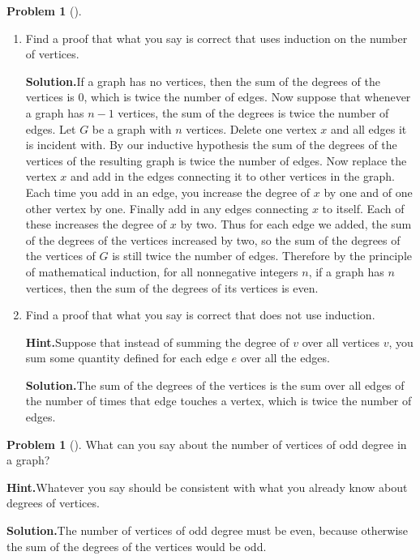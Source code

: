 \documentclass[10pt,]{book}
\theoremstyle{plain}
\theoremstyle{definition}
\newtheorem{activity}[project]{Problem}
\theoremstyle{definition}
\numberwithin{equation}{chapter}
\begin{document}
\begin{activity}[]
\begin{enumerate}[font=\bfseries,label=(\alph*),ref=\alph*]
\item\label{task-89} Find a proof that what you say is correct that uses induction on the number of vertices.%
\par\medskip\noindent%
\textbf{Solution.}\quad If a graph has no vertices, then the sum of the degrees of the vertices is 0, which is twice the number of edges. Now suppose that whenever a graph has \(n-1\) vertices, the sum of the degrees is twice the number of edges. Let \(G\) be a graph with \(n\) vertices. Delete one vertex \(x\) and all edges it is incident with. By our inductive hypothesis the sum of the degrees of the vertices of the resulting graph is twice the number of edges. Now replace the vertex \(x\) and add in the edges connecting it to other vertices in the graph. Each time you add in an edge, you increase the degree of \(x\) by one and of one other vertex by one. Finally add in any edges connecting \(x\) to itself. Each of these increases the degree of \(x\) by two. Thus for each edge we added, the sum of the degrees of the vertices increased by two, so the sum of the degrees of the vertices of \(G\) is still twice the number of edges. Therefore by the principle of mathematical induction, for all nonnegative integers \(n\), if a graph has \(n\) vertices, then the sum of the degrees of its vertices is even.%
\item\label{task-90} Find a proof that what you say is correct that does not use induction.%
\par\medskip\noindent%
\textbf{Hint.}\quad Suppose that instead of summing the degree of \(v\) over all vertices \(v\), you sum some quantity defined for each edge \(e\) over all the edges.%
\par\medskip\noindent%
\textbf{Solution.}\quad The sum of the degrees of the vertices is the sum over all edges of the number of times that edge touches a vertex, which is twice the number of edges.%
\end{enumerate}
\end{activity}
\begin{activity}[]\label{activity-103}
What can you say about the number of vertices of odd degree in a graph?%
\par\medskip\noindent%
\textbf{Hint.}\quad Whatever you say should be consistent with what you already know about degrees of vertices.%
\par\medskip\noindent%
\textbf{Solution.}\quad The number of vertices of odd degree must be even, because otherwise the sum of the degrees of the vertices would be odd.%
\end{activity}
\typeout{************************************************}
\typeout{************************************************}
\end{document}
